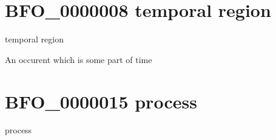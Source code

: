 \documentclass[letterpaper,10pt,english]{sphinxmanual}
\begin{document}
\begin{sphinxShadowBox}

\sphinxAtStartPar
{}
\end{sphinxShadowBox}
\begin{quote}
\label{\detokenize{doc-BFO_0000008:bfo-0000008}}\label{\detokenize{doc-BFO_0000008:temporal-region}}\label{\detokenize{doc-BFO_0000008:bfo-0000008}}
\ignorespaces \end{quote}


\section{BFO\_0000008 \sphinxhyphen{} temporal region}
\label{\detokenize{doc-BFO_0000008:bfo-0000008-temporal-region}}\label{\detokenize{doc-BFO_0000008:index-0}}\label{\detokenize{doc-BFO_0000008::doc}}
\begin{sphinxShadowBox}

\sphinxAtStartPar
temporal region
\end{sphinxShadowBox}

\begin{sphinxShadowBox}

\sphinxAtStartPar
An occurent which is some part of time
\end{sphinxShadowBox}

\begin{sphinxShadowBox}

\sphinxAtStartPar
{}
\end{sphinxShadowBox}
\begin{quote}
\label{\detokenize{doc-BFO_0000015:bfo-0000015}}\label{\detokenize{doc-BFO_0000015:process}}\label{\detokenize{doc-BFO_0000015:bfo-0000015}}
\ignorespaces \end{quote}


\section{BFO\_0000015 \sphinxhyphen{} process}
\label{\detokenize{doc-BFO_0000015:bfo-0000015-process}}\label{\detokenize{doc-BFO_0000015:index-0}}\label{\detokenize{doc-BFO_0000015::doc}}
\begin{sphinxShadowBox}

\sphinxAtStartPar
process
\end{sphinxShadowBox}
\end{document}
